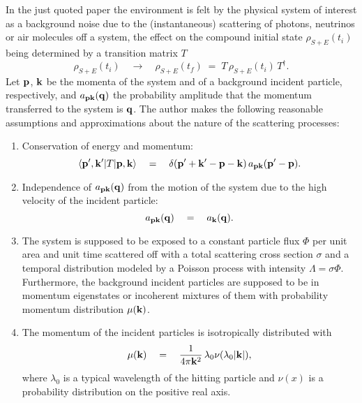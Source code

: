 \documentclass[10pt,a4paper]{article}
\begin{document}
In the just quoted paper the environment is felt by the physical system
of interest as a background noise due to the (instantaneous) scattering of
photons, neutrinos or air molecules off a system, the effect on
the compound initial state $\rho_{S+E}(t_{i})$ being determined by
a transition matrix $T$
\begin{equation}
\rho_{S+E}(t_{i}) \quad \longrightarrow \quad \rho_{S+E}(t_{f}) \;
= \; T\,\rho_{S+E}(t_{i})\, T^{\dagger}.
\end{equation}
Let ${\bf p}$, ${\bf k}$ be the momenta of the system and of a
background incident particle, respectively, and $a_{\bf p k}({\bf
q})$ the probability amplitude that the momentum transferred to
the system is ${\bf q}$. The author makes the following reasonable
assumptions  and approximations about the nature of the scattering
processes:
\begin{enumerate}
\item Conservation of energy and momentum:
\[
\langle {\bf p}', {\bf k}'|T|{\bf p}, {\bf k} \rangle \quad =
\quad \delta({\bf p}' + {\bf k}' - {\bf p} - {\bf k})\, a_{\bf p
k}({\bf p}' - {\bf p}).
\]
\item Independence of $a_{\bf p k}({\bf q})$ from the motion of
the system due to the high velocity of the incident particle:
\[
a_{\bf p k}({\bf q}) \quad = \quad a_{\bf k}({\bf q}).
\]
\item The system is supposed to be exposed to a constant particle
flux $\Phi$ per unit area and unit time scattered off with a total
scattering cross section $\sigma$ and a temporal distribution
modeled by a Poisson process with intensity $\Lambda = \sigma
\Phi$. Furthermore, the background incident particles are supposed
to be in momentum eigenstates or incoherent mixtures of them with
probability momentum distribution $\mu({\bf k})$. \item The
momentum of the incident particles is isotropically distributed
with
\begin{equation}
\mu({\bf k}) \quad = \quad \frac{1}{4\pi{\bf k}^{2}}\,
\lambda_{0}\nu(\lambda_{0}|{\bf k}|),
\end{equation}
where $\lambda_{0}$ is a typical wavelength of the hitting
particle and $\nu(x)$ is a probability distribution on the
positive real axis.
\end{enumerate}
\end{document}
